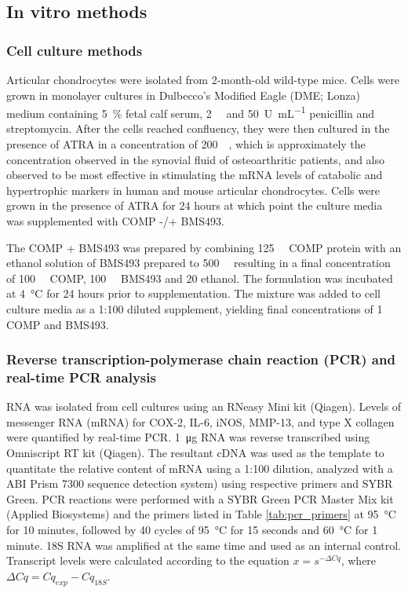 \begin{refsection}
\subsection{In vitro methods}

\subsubsection{Cell culture methods}
Articular chondrocytes were isolated from 2-month-old wild-type mice.  Cells
were grown in monolayer cultures in Dulbecco's Modified Eagle (DME; Lonza)
medium containing \SI{5}{\percent} fetal calf serum, \SI{2}{\milli\moLar}
 and \SI{50}{U\per\mL} penicillin and streptomycin. After
the cells reached confluency, they were then cultured in the presence of ATRA in
a concentration of \SI{200}{\nano\moLar}, which is approximately the
concentration observed in the synovial fluid of osteoarthritic
patients,\cite{Davies2009} and also observed to be most effective in stimulating
the mRNA levels of catabolic and hypertrophic markers in human and mouse
articular chondrocytes.\cite{Campbell2013b} Cells were grown in the presence of
ATRA for 24 hours at which point the culture media was supplemented with
COMP -/+ BMS493.

The COMP + BMS493 was prepared by combining \SI{125}{\micro\moLar} COMP protein
with an ethanol solution of BMS493 prepared to \SI{500}{\micro\moLar} resulting
in a final concentration of \SI{100}{\micro\moLar} COMP, \SI{100}{\micro\moLar}
BMS493 and \SI{20}{\volper} ethanol. The formulation was incubated at
\SI{4}{\celsius} for 24 hours prior to supplementation. The mixture was added to
cell culture media as a 1:100 diluted supplement, yielding final concentrations
of \SI{1}{\micro\moLar} COMP and BMS493.

\subsubsection{Reverse transcription-polymerase chain reaction (PCR) and
real-time PCR analysis} RNA was isolated from cell cultures using an RNeasy Mini
kit (Qiagen). Levels of messenger RNA (mRNA) for COX-2, IL-6, iNOS, MMP-13, and
type X collagen were quantified by real-time PCR. \SI{1}{\micro\gram} RNA was
reverse transcribed using Omniscript RT kit (Qiagen). The resultant cDNA was
used as the template to quantitate the relative content of mRNA using a 1:100
dilution, analyzed with a ABI Prism 7300 sequence detection system) using
respective primers and SYBR Green.  PCR reactions were performed with a SYBR
Green PCR Master Mix kit (Applied Biosystems) and the primers listed in Table
\ref{tab:pcr_primers} at \SI{95}{\celsius} for 10 minutes, followed by 40 cycles
of \SI{95}{\celsius} for 15 seconds and \SI{60}{\celsius} for 1 minute. 18S RNA
was amplified at the same time and used as an internal control. Transcript
levels were calculated according to the equation ${x=s^{- \Delta C q}}$, where
${\Delta C q = C q_{exp} - C q _{18S}}$.


\end{refsection}
